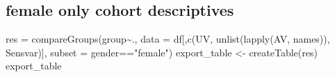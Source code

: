 \documentclass[
]{article}
\newenvironment{Shaded}{\begin{snugshade}}{\end{snugshade}}
\newcommand{\AttributeTok}[1]{\textcolor[rgb]{0.77,0.63,0.00}{#1}}
\newcommand{\FunctionTok}[1]{\textcolor[rgb]{0.00,0.00,0.00}{#1}}
\newcommand{\NormalTok}[1]{#1}
\newcommand{\OtherTok}[1]{\textcolor[rgb]{0.56,0.35,0.01}{#1}}
\newcommand{\SpecialCharTok}[1]{\textcolor[rgb]{0.00,0.00,0.00}{#1}}
\newcommand{\StringTok}[1]{\textcolor[rgb]{0.31,0.60,0.02}{#1}}
\begin{document}
\hypertarget{female-only-cohort-descriptives}{%
\subsection{female only cohort
descriptives}\label{female-only-cohort-descriptives}}

\begin{Shaded}
\begin{Highlighting}[]
\NormalTok{res }\OtherTok{=} \FunctionTok{compareGroups}\NormalTok{(group}\SpecialCharTok{\textasciitilde{}}\NormalTok{., }
                    \AttributeTok{data =}\NormalTok{ df[,}\FunctionTok{c}\NormalTok{(UV, }\FunctionTok{unlist}\NormalTok{(}\FunctionTok{lapply}\NormalTok{(AV, names)), Sensvar)], }
                    \AttributeTok{subset =}\NormalTok{ gender}\SpecialCharTok{==}\StringTok{"female"}\NormalTok{)}
\NormalTok{export\_table }\OtherTok{\textless{}{-}} \FunctionTok{createTable}\NormalTok{(res)}
\NormalTok{export\_table}
\end{Highlighting}
\end{Shaded}
\end{document}

